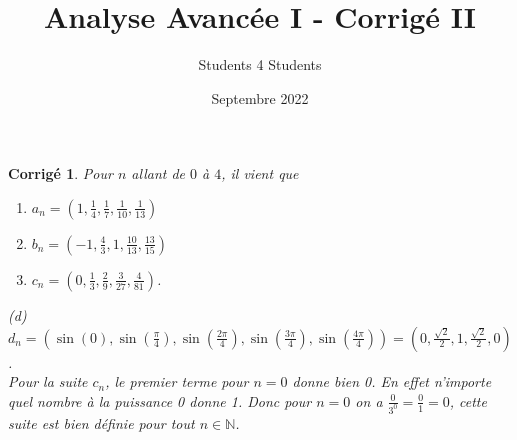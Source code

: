 \documentclass[11pt,french,table]{article}
\title{Analyse Avancée I - Corrigé II}
\author{Students 4 Students}
\date{Septembre 2022}
\theoremstyle{exercice}
\theoremstyle{corrigé}
\newtheorem{corrigé}{Corrigé}
\begin{document}
\maketitle
\begin{corrigé}
      

    Pour $n$ allant de $0$ à $4$, il vient que 
     \begin{multicols}{2}
    \begin{enumerate}
   
        \item[(a)] $a_n=(1,\frac{1}{4},\frac{1}{7},\frac{1}{10},\frac{1}{13})$
        \item[(b)] $b_n=(-1,\frac{4}{3},1,\frac{10}{13},\frac{13}{15})$
   
    \columnbreak  %
    \item[(c)] $c_n=(0,\frac{1}{3},\frac{2}{9},\frac{3}{27},\frac{4}{81})$. 
     \end{enumerate}
\end{multicols}
(d)
    $d_n = (\sin{(0)},\sin{(\frac{\pi}{4})},\sin{(\frac{2\pi}{4})}, \sin{(\frac{3\pi}{4})},\sin{(\frac{4\pi}{4})})=(0,\frac{\sqrt{2}}{2},1,\frac{\sqrt{2}}{2},0)$. \\
    
Pour la suite $c_n$, le premier terme pour $n=0$ donne bien 0. En effet n'importe quel nombre à la puissance 0 donne 1. Donc pour $n=0$ on a $\frac{0}{3^0}=\frac{0}{1}=0$, cette suite est bien définie pour tout $n\in \mathbb{N}$.
\end{corrigé}
\vspace{1em}
\end{document}

